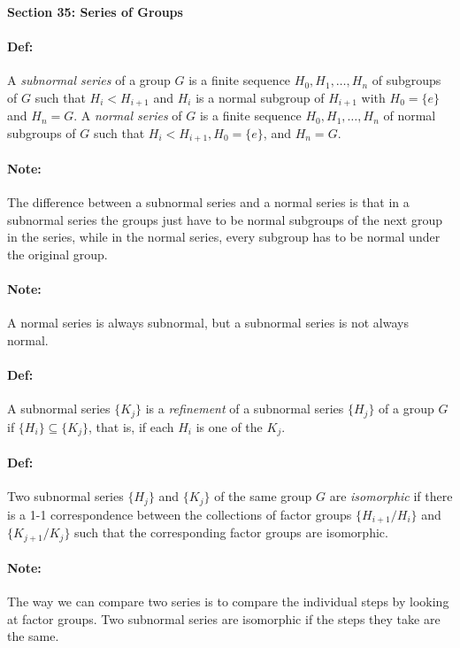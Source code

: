 \documentclass[10pt,a4paper]{article}
\begin{document}
\begin{center}
\textbf{Section 35: Series of Groups}
\end{center}

\paragraph{Def:} A \textit{subnormal series} of a group $G$ is a finite sequence $H_0, H_1, \dots, H_n$ of subgroups of $G$ such that $H_i < H_{i+1}$ and $H_i$ is a normal subgroup of $H_{i+1}$ with $H_0 = \{e\}$ and $H_n = G$. A \textit{normal series} of $G$ is a finite sequence $H_0, H_1, \dots, H_n$ of normal subgroups of $G$ such that $H_i < H_{i+1}, H_0 = \{e\}$, and $H_n=G$.

\paragraph{Note:} The difference between a subnormal series and a normal series is that in a subnormal series the groups just have to be normal subgroups of the next group in the series, while in the normal series, every subgroup has to be normal under the original group.

\paragraph{Note:} A normal series is always subnormal, but a subnormal series is not always normal.

\paragraph{Def:} A subnormal series $\{ K_j \}$ is a \textit{refinement} of a subnormal series $\{H_j\}$ of a group $G$ if $\{H_i\} \subseteq \{K_j\}$, that is, if each $H_i$ is one of the $K_j$.

\paragraph{Def:} Two subnormal series $\{ H_j \}$ and $\{K_j\}$ of the same group $G$ are \textit{isomorphic} if there is a 1-1 correspondence between the collections of factor groups $\{ H_{i+1}/H_i\}$ and $\{K_{j+1}/K_j\}$ such that the corresponding factor groups are isomorphic.

\paragraph{Note:} The way we can compare two series is to compare the individual steps by looking at factor groups. Two subnormal series are isomorphic if the steps they take are the same.
\end{document}
